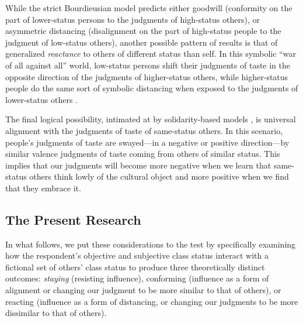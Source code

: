 \documentclass[12pt, letterpaper]{article}
\begin{document}
While the strict Bourdieusian model predicts either goodwill (conformity on the part of lower-status persons to the judgments of high-status others), or asymmetric distancing (disalignment on the part of high-status people to the judgment of low-status others), another possible pattern of results is that of generalized \textit{reactance} to others of different status than self. In this symbolic ``war of all against all'' world, low-status persons shift their judgments of taste in the opposite direction of the judgments of higher-status others, while higher-status people do the same sort of symbolic distancing when exposed to the judgments of lower-status others \citep{tampubolon2008revisiting}. 

The final logical possibility, intimated at by solidarity-based models \citep{dimaggio1987, wohl2015community-2d2}, is universal alignment with the judgments of taste of same-status others. In this scenario, people's judgments of taste are swayed---in a negative or positive direction---by similar valence judgments of taste coming from others of similar status. This implies that our judgments will become more negative when we learn that same-status others think lowly of the cultural object and more positive when we find that they embrace it. 

\subsection{The Present Research}

In what follows, we put these considerations to the test by specifically examining how the respondent's objective and subjective class status interact with a fictional set of others' class status to produce three theoretically distinct outcomes: \textit{staying} (resisting influence), conforming (influence as a form of alignment or changing our judgment to be more similar to that of others), or reacting (influence as a form of distancing, or changing our judgments to be more dissimilar to that of others).
\end{document}
